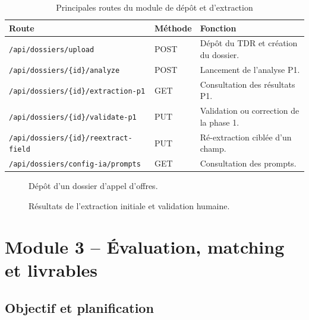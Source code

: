 \begin{table}[H]
\centering
\small
\caption{Principales routes du module de dépôt et d’extraction}
\begin{tabularx}{\textwidth}{p{4.5cm}p{1.5cm}Y}
\toprule
\textbf{Route} & \textbf{Méthode} & \textbf{Fonction} \\
\midrule
\texttt{/api/dossiers/upload} & POST & Dépôt du TDR et création du dossier. \\
\texttt{/api/dossiers/\{id\}/analyze} & POST & Lancement de l’analyse P1. \\
\texttt{/api/dossiers/\{id\}/extraction-p1} & GET & Consultation des résultats P1. \\
\texttt{/api/dossiers/\{id\}/validate-p1} & PUT & Validation ou correction de la phase 1. \\
\texttt{/api/dossiers/\{id\}/reextract-field} & PUT & Ré-extraction ciblée d’un champ. \\
\texttt{/api/dossiers/config-ia/prompts} & GET & Consultation des prompts. \\
\bottomrule
\end{tabularx}
\end{table}

\begin{figure}[H]
\centering
\caption{Dépôt d’un dossier d’appel d’offres.}
\label{fig:upload}
\end{figure}

\begin{figure}[H]
\centering
\caption{Résultats de l’extraction initiale et validation humaine.}
\label{fig:extraction-p1}
\end{figure}

\section{Module 3 -- Évaluation, matching et livrables}

\subsection{Objectif et planification}

